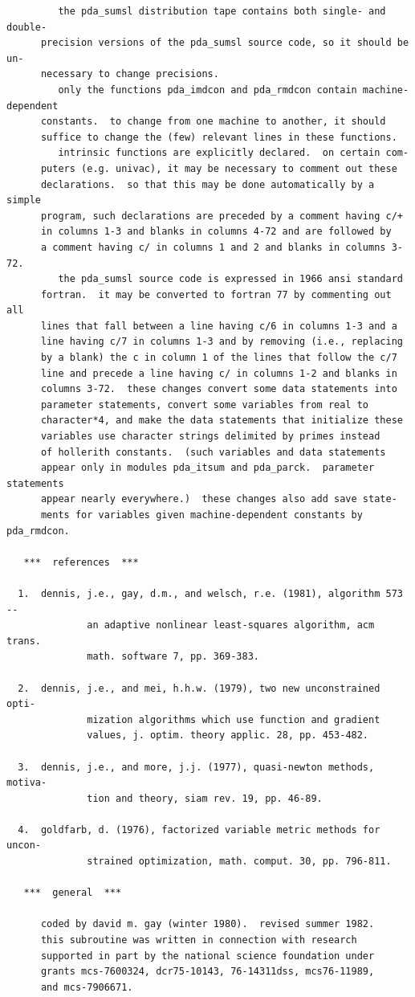 \documentclass[11pt,twoside]{article}
\begin{document}
\begin{verbatim}
         the pda_sumsl distribution tape contains both single- and double-
      precision versions of the pda_sumsl source code, so it should be un-
      necessary to change precisions.
         only the functions pda_imdcon and pda_rmdcon contain machine-dependent
      constants.  to change from one machine to another, it should
      suffice to change the (few) relevant lines in these functions.
         intrinsic functions are explicitly declared.  on certain com-
      puters (e.g. univac), it may be necessary to comment out these
      declarations.  so that this may be done automatically by a simple
      program, such declarations are preceded by a comment having c/+
      in columns 1-3 and blanks in columns 4-72 and are followed by
      a comment having c/ in columns 1 and 2 and blanks in columns 3-72.
         the pda_sumsl source code is expressed in 1966 ansi standard
      fortran.  it may be converted to fortran 77 by commenting out all
      lines that fall between a line having c/6 in columns 1-3 and a
      line having c/7 in columns 1-3 and by removing (i.e., replacing
      by a blank) the c in column 1 of the lines that follow the c/7
      line and precede a line having c/ in columns 1-2 and blanks in
      columns 3-72.  these changes convert some data statements into
      parameter statements, convert some variables from real to
      character*4, and make the data statements that initialize these
      variables use character strings delimited by primes instead
      of hollerith constants.  (such variables and data statements
      appear only in modules pda_itsum and pda_parck.  parameter statements
      appear nearly everywhere.)  these changes also add save state-
      ments for variables given machine-dependent constants by pda_rmdcon.

   ***  references  ***

  1.  dennis, j.e., gay, d.m., and welsch, r.e. (1981), algorithm 573 --
              an adaptive nonlinear least-squares algorithm, acm trans.
              math. software 7, pp. 369-383.

  2.  dennis, j.e., and mei, h.h.w. (1979), two new unconstrained opti-
              mization algorithms which use function and gradient
              values, j. optim. theory applic. 28, pp. 453-482.

  3.  dennis, j.e., and more, j.j. (1977), quasi-newton methods, motiva-
              tion and theory, siam rev. 19, pp. 46-89.

  4.  goldfarb, d. (1976), factorized variable metric methods for uncon-
              strained optimization, math. comput. 30, pp. 796-811.

   ***  general  ***

      coded by david m. gay (winter 1980).  revised summer 1982.
      this subroutine was written in connection with research
      supported in part by the national science foundation under
      grants mcs-7600324, dcr75-10143, 76-14311dss, mcs76-11989,
      and mcs-7906671.



\end{verbatim}
\end{document}

